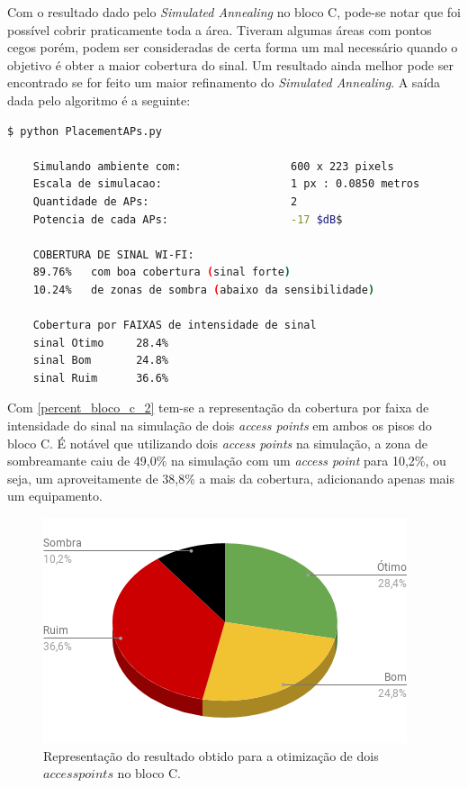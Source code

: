 \documentclass[
	12pt,				%
	twoside,			%
	a4paper,			%
	english,			%
	french,				%
	spanish,			%
	brazil				%
	]{abntex2}
\begin{document}
Com o resultado dado pelo \emph{Simulated Annealing} no bloco C, pode-se
notar que foi possível cobrir praticamente toda a área. Tiveram algumas
áreas com pontos cegos porém, podem ser consideradas de certa forma um
mal necessário quando o objetivo é obter a maior cobertura do sinal. Um
resultado ainda melhor pode ser encontrado se for feito um maior
refinamento do \emph{Simulated Annealing}. A saída dada pelo algoritmo é
a seguinte:

\begin{lstlisting}[language=bash]
    $ python PlacementAPs.py 
    
    Simulando ambiente com:                 600 x 223 pixels
    Escala de simulacao:                    1 px : 0.0850 metros
    Quantidade de APs:                      2
    Potencia de cada APs:                   -17 $dB$
    
    COBERTURA DE SINAL WI-FI:
    89.76%   com boa cobertura (sinal forte)
    10.24%   de zonas de sombra (abaixo da sensibilidade)
    
    Cobertura por FAIXAS de intensidade de sinal
    sinal Otimo     28.4%
    sinal Bom       24.8%
    sinal Ruim      36.6%
\end{lstlisting}

Com \autoref{percent_bloco_c_2} tem-se a representação da cobertura por
faixa de intensidade do sinal na simulação de dois \emph{access points}
em ambos os pisos do bloco C. É notável que utilizando dois \emph{access
points} na simulação, a zona de sombreamante caiu de 49,0\% na simulação
com um \emph{access point} para 10,2\%, ou seja, um aproveitamente de
38,8\% a mais da cobertura, adicionando apenas mais um equipamento.

\begin{figure}[ht]
    \caption{\label{percent_bloco_c_2} Representação do resultado obtido para a otimização de dois $access points$ no bloco C.}
    \begin{center}
        \includegraphics[scale=0.7]{imagens/percent-bloco-c-2.png}
    \end{center}
\end{figure}
\end{document}
